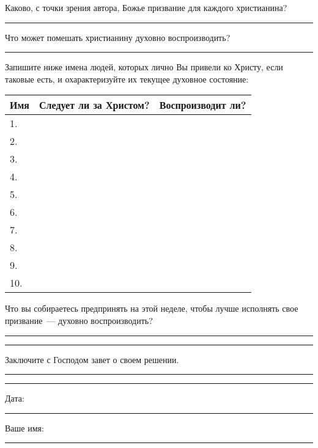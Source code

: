 \documentclass[12pt,article,a4paper,fittopage]{ncc}
\newcommand{\HRule}{\vspace{0.2cm}\noindent\rule{\linewidth}{0.1mm}}
\begin{document}
\noindent
Каково, с точки зрения автора, Божье призвание для каждого христианина?

\HRule

\noindent
Что может помешать христианину духовно воспроизводить?

\HRule

\noindent
Запишите ниже имена людей, которых лично Вы привели ко Христу, если таковые есть, и охарактеризуйте их текущее духовное состояние:

\vspace{0.1cm}
\begin{center}
\begin{tabular}{|l|c|c|}
\hline
\hspace{2.5cm}Имя\hspace{2.5cm} & Следует ли за Христом? & Воспроизводит ли? \\
\hline
1. & & \\
\hline
2. & & \\
\hline
3. & & \\
\hline
4. & & \\
\hline
5. & & \\
\hline
6. & & \\
\hline
7. & & \\
\hline
8. & & \\
\hline
9. & & \\
\hline
10. & & \\
\hline
\end{tabular}
\end{center}

\vspace{0.1cm}
\noindent
Что вы собираетесь предпринять на этой неделе, чтобы лучше исполнять свое призвание~--- духовно воспроизводить?

\HRule

\HRule

\noindent
Заключите с Господом завет о своем решении.

\HRule

\HRule

\vspace{0.3cm}
\noindent
Дата: \rule{5cm}{0.2pt} \hspace{2cm} Ваше имя: \rule{6.5cm}{0.2pt}
\end{document}
